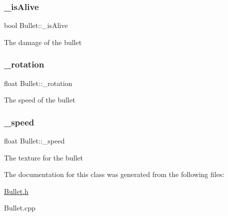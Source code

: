 \subsubsection{\texorpdfstring{\+\_\+is\+Alive}{\_isAlive}}
{\footnotesize\ttfamily bool Bullet\+::\+\_\+is\+Alive\hspace{0.3cm}{\ttfamily [private]}}

The damage of the bullet \mbox{\label{class_bullet_a1904e460221accb69ae194fc4eb7d54f}} 
\subsubsection{\texorpdfstring{\+\_\+rotation}{\_rotation}}
{\footnotesize\ttfamily float Bullet\+::\+\_\+rotation\hspace{0.3cm}{\ttfamily [private]}}

The speed of the bullet \mbox{\label{class_bullet_a6a971a89bb69a7e9d5be0955e78d12a5}} 
\subsubsection{\texorpdfstring{\+\_\+speed}{\_speed}}
{\footnotesize\ttfamily float Bullet\+::\+\_\+speed\hspace{0.3cm}{\ttfamily [private]}}

The texture for the bullet 

The documentation for this class was generated from the following files\+:\begin{DoxyCompactItemize}
\item 
\hyperlink{_bullet_8h}{Bullet.\+h}\item 
Bullet.\+cpp\end{DoxyCompactItemize}
